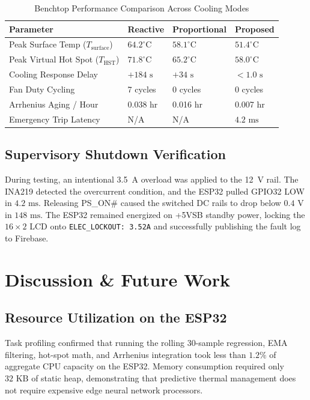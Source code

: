 \documentclass[conference]{IEEEtran}
\begin{document}
\begin{table}[htbp]
\caption{Benchtop Performance Comparison Across Cooling Modes}
\begin{center}
\begin{tabular}{llll}
\toprule
\textbf{Parameter} & \textbf{Reactive} & \textbf{Proportional} & \textbf{Proposed} \\
\midrule
Peak Surface Temp ($T_{\text{surface}}$) & $64.2^\circ\text{C}$ & $58.1^\circ\text{C}$ & $51.4^\circ\text{C}$ \\
Peak Virtual Hot Spot ($T_{\text{HST}}$) & $71.8^\circ\text{C}$ & $65.2^\circ\text{C}$ & $58.0^\circ\text{C}$ \\
Cooling Response Delay & $+184\text{ s}$ & $+34\text{ s}$ & $< 1.0\text{ s}$ \\
Fan Duty Cycling & 7 cycles & 0 cycles & 0 cycles \\
Arrhenius Aging / Hour & 0.038 hr & 0.016 hr & 0.007 hr \\
Emergency Trip Latency & N/A & N/A & $4.2\text{ ms}$ \\
\bottomrule
\end{tabular}
\label{tab3}
\end{center}
\end{table}

\subsection{Supervisory Shutdown Verification}
During testing, an intentional 3.5~A overload was applied to the 12~V rail. The INA219 detected the overcurrent condition, and the ESP32 pulled GPIO32 LOW in $4.2\text{ ms}$. Releasing PS\_ON\# caused the switched DC rails to drop below $0.4\text{ V}$ in $148\text{ ms}$. The ESP32 remained energized on +5VSB standby power, locking the $16\times2$ LCD onto \texttt{ELEC\_LOCKOUT: 3.52A} and successfully publishing the fault log to Firebase.

\section{Discussion \& Future Work}

\subsection{Resource Utilization on the ESP32}
Task profiling confirmed that running the rolling 30-sample regression, EMA filtering, hot-spot math, and Arrhenius integration took less than $1.2\%$ of aggregate CPU capacity on the ESP32. Memory consumption required only $32\text{ KB}$ of static heap, demonstrating that predictive thermal management does not require expensive edge neural network processors.
\end{document}
